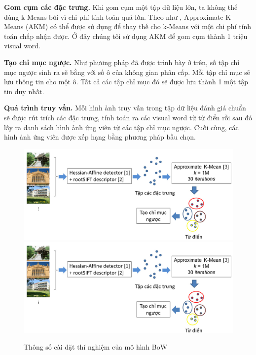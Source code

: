\textbf{Gom cụm các đặc trưng.} Khi gom cụm một tập dữ liệu lớn, ta không thể dùng k-Means bởi vì chi phí tính toán quá lớn. Theo như \cite{philbin2007object}, Approximate K-Means (AKM) có thể được sử dụng để thay thế cho k-Means với một chi phí tính toán chấp nhận được. Ở đây chúng tôi sử dụng AKM để gom cụm thành 1 triệu visual word.

\textbf{Tạo chỉ mục ngược.} Như phương pháp đã được trình bày ở trên, số tập chỉ mục ngược sinh ra sẽ bằng với số ô của không gian phân cấp. Mỗi tập chỉ mục sẽ lưu thông tin cho một ô. Tất cả các tập chỉ mục đó sẽ được lưu thành 1 một tập tin duy nhất.

\textbf{Quá trình truy vấn.} Mỗi hình ảnh truy vấn trong tập dữ liệu đánh giá chuẩn sẽ được rút trích các đặc trưng, tính toán ra các visual word từ từ điển rồi sau đó lấy ra danh sách hình ảnh ứng viên từ các tập chỉ mục ngược. Cuối cùng, các hình ảnh ứng viên được xếp hạng bằng phương pháp bầu chọn.

\begin{figure}[!htbp]
  \begin{center}
    \leavevmode
    \ifpdf
      \includegraphics[scale=0.34]{experiment_setting}
    \else
      \includegraphics[scale=0.34]{experiment_setting}
    \fi
    \caption[Thông số cài đặt thí nghiệm của mô hình BoW]{Thông số cài đặt thí nghiệm của mô hình BoW}
    \label{FigExperimentSetting}
  \end{center}
\end{figure}

